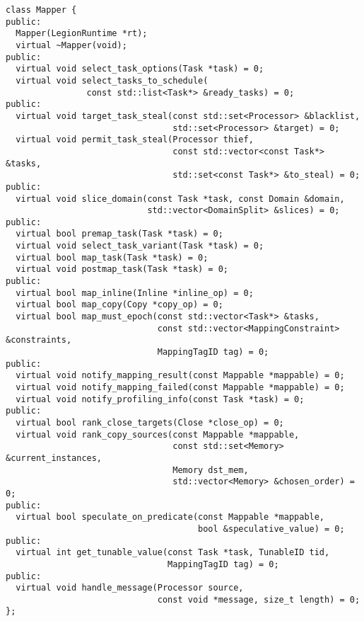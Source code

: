 \begin{lstlisting}[float,floatplacement=h,label={lst:mapinterface},caption={Abstract C++ class declaration of the mapper interface.}]
class Mapper {
public:
  Mapper(LegionRuntime *rt);
  virtual ~Mapper(void);
public:
  virtual void select_task_options(Task *task) = 0;
  virtual void select_tasks_to_schedule(
                const std::list<Task*> &ready_tasks) = 0;
public:
  virtual void target_task_steal(const std::set<Processor> &blacklist,
                                 std::set<Processor> &target) = 0;
  virtual void permit_task_steal(Processor thief,
                                 const std::vector<const Task*> &tasks,
                                 std::set<const Task*> &to_steal) = 0;
public:
  virtual void slice_domain(const Task *task, const Domain &domain,
                            std::vector<DomainSplit> &slices) = 0;
public:
  virtual bool premap_task(Task *task) = 0;
  virtual void select_task_variant(Task *task) = 0;
  virtual bool map_task(Task *task) = 0;
  virtual void postmap_task(Task *task) = 0;
public:
  virtual bool map_inline(Inline *inline_op) = 0;
  virtual bool map_copy(Copy *copy_op) = 0;
  virtual bool map_must_epoch(const std::vector<Task*> &tasks,
                              const std::vector<MappingConstraint> &constraints,
                              MappingTagID tag) = 0;
public:
  virtual void notify_mapping_result(const Mappable *mappable) = 0;
  virtual void notify_mapping_failed(const Mappable *mappable) = 0;
  virtual void notify_profiling_info(const Task *task) = 0;
public:
  virtual bool rank_close_targets(Close *close_op) = 0;
  virtual void rank_copy_sources(const Mappable *mappable,
                                 const std::set<Memory> &current_instances,
                                 Memory dst_mem, 
                                 std::vector<Memory> &chosen_order) = 0;
public:
  virtual bool speculate_on_predicate(const Mappable *mappable,
                                      bool &speculative_value) = 0;
public:
  virtual int get_tunable_value(const Task *task, TunableID tid,
                                MappingTagID tag) = 0;
public:
  virtual void handle_message(Processor source, 
                              const void *message, size_t length) = 0;
};
\end{lstlisting}

